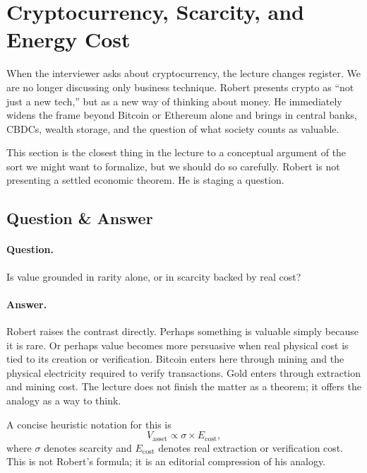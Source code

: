 \section{Cryptocurrency, Scarcity, and Energy Cost}

When the interviewer asks about cryptocurrency, the lecture changes register. We are no longer discussing only business technique. Robert presents crypto as ``not just a new tech,'' but as a new way of thinking about money. He immediately widens the frame beyond Bitcoin or Ethereum alone and brings in central banks, CBDCs, wealth storage, and the question of what society counts as valuable.

This section is the closest thing in the lecture to a conceptual argument of the sort we might want to formalize, but we should do so carefully. Robert is not presenting a settled economic theorem. He is staging a question.

\subsection{Question \& Answer}

\paragraph{Question.}
Is value grounded in rarity alone, or in scarcity backed by real cost?

\paragraph{Answer.}
Robert raises the contrast directly. Perhaps something is valuable simply because it is rare. Or perhaps value becomes more persuasive when real physical cost is tied to its creation or verification. Bitcoin enters here through mining and the physical electricity required to verify transactions. Gold enters through extraction and mining cost. The lecture does not finish the matter as a theorem; it offers the analogy as a way to think.

A concise heuristic notation for this is
\begin{equation}
V_{\text{asset}} \propto \sigma \times E_{\text{cost}},
\end{equation}
where \(\sigma\) denotes scarcity and \(E_{\text{cost}}\) denotes real extraction or verification cost. This is not Robert's formula; it is an editorial compression of his analogy.

